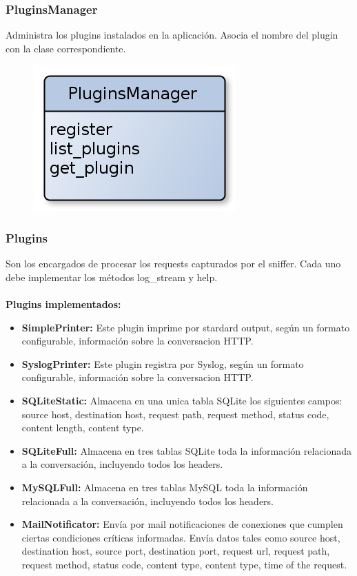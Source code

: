 \subsubsection{PluginsManager}

Administra los plugins instalados en la aplicación. Asocia el nombre del plugin con la clase correspondiente.

\begin{figure}[hbtp]
    \centering
	\includegraphics[scale=0.40]{img/PluginsManager.png} 
\end{figure}

\subsubsection{Plugins}

Son los encargados de procesar los requests capturados por el sniffer. Cada uno debe implementar los métodos log\_stream y help. 
\\\\
\textbf{Plugins implementados:}
\begin{itemize}
	\item \textbf{SimplePrinter:} Este plugin imprime por stardard output, según un formato configurable, información sobre la conversacion HTTP.
	\item \textbf{SyslogPrinter: } Este plugin registra por Syslog, según un formato configurable, información sobre la conversacion HTTP.
	\item \textbf{SQLiteStatic:} Almacena en una unica tabla SQLite los siguientes campos: source host, destination host, request path, request method, status code, content length, content type.
	\item \textbf{SQLiteFull: } Almacena en tres tablas SQLite toda la información relacionada a la conversación, incluyendo todos los headers.
	\item \textbf{MySQLFull: } Almacena en tres tablas MySQL toda la información relacionada a la conversación, incluyendo todos los headers.
	\item \textbf{MailNotificator: } Envía por mail notificaciones de conexiones que cumplen ciertas condiciones críticas informadas. Envía datos tales como source host, destination host, source port, destination port, request url, request path, request method, status code, content type, content type, time of the request.
\end{itemize}

